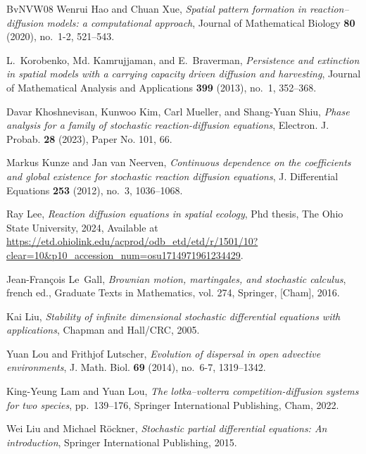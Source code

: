 \documentclass[final]{amsart}
\numberwithin{thm}{section}
\numberwithin{equation}{section}
\begin{document}
\begin{thebibliography}{BvNVW08}
Wenrui Hao and Chuan Xue, \emph{Spatial pattern formation in
  reaction–diffusion models: a computational approach}, Journal of
  Mathematical Biology \textbf{80} (2020), no.~1-2, 521--543.

L.~Korobenko, Md. Kamrujjaman, and E.~Braverman, \emph{Persistence and
  extinction in spatial models with a carrying capacity driven diffusion and
  harvesting}, Journal of Mathematical Analysis and Applications \textbf{399}
  (2013), no.~1, 352--368.

Davar Khoshnevisan, Kunwoo Kim, Carl Mueller, and Shang-Yuan Shiu, \emph{Phase
  analysis for a family of stochastic reaction-diffusion equations}, Electron.
  J. Probab. \textbf{28} (2023), Paper No. 101, 66. 

Markus Kunze and Jan van Neerven, \emph{Continuous dependence on the
  coefficients and global existence for stochastic reaction diffusion
  equations}, J. Differential Equations \textbf{253} (2012), no.~3, 1036--1068.

Ray Lee, \emph{Reaction diffusion equations in spatial ecology}, Phd thesis,
  The Ohio State University, 2024, Available at
  \url{https://etd.ohiolink.edu/acprod/odb_etd/etd/r/1501/10?clear=10&p10_accession_num=osu1714971961234429}.

Jean-Fran\c{c}ois Le~Gall, \emph{Brownian motion, martingales, and stochastic
  calculus}, french ed., Graduate Texts in Mathematics, vol. 274, Springer,
  [Cham], 2016. 

Kai Liu, \emph{Stability of infinite dimensional stochastic differential
  equations with applications}, Chapman and Hall/CRC, 2005.

Yuan Lou and Frithjof Lutscher, \emph{Evolution of dispersal in open advective
  environments}, J. Math. Biol. \textbf{69} (2014), no.~6-7, 1319--1342.

King-Yeung Lam and Yuan Lou, \emph{The lotka--volterra competition-diffusion
  systems for two species}, pp.~139--176, Springer International Publishing,
  Cham, 2022.

Wei Liu and Michael R\"{o}ckner, \emph{Stochastic partial differential
  equations: An introduction}, Springer International Publishing, 2015.


\end{thebibliography}
\end{document}
